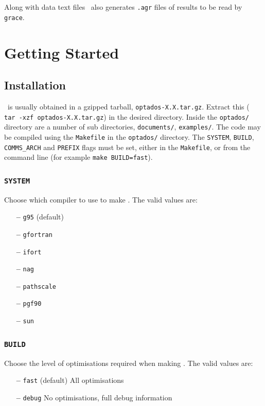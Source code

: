 \documentclass[a4paper,11pt,twoside]{book}
\begin{document}
Along with data text files \optados\ also generates \verb#.agr# files of results to be read by \verb#grace#. 


\chapter{Getting Started}\label{chap:getting_started}
\section{Installation}
\optados\ is usually obtained in a gzipped tarball, \verb#optados-X.X.tar.gz#. Extract this ( \verb# tar -xzf optados-X.X.tar.gz#) in the desired directory. Inside the  \verb#optados/# directory are a number of sub directories,  \verb#documents/#,   \verb#examples/#.  The code may be compiled using the \verb#Makefile# in the  \verb#optados/# directory.  The \verb#SYSTEM#, \verb#BUILD#, \verb#COMMS_ARCH# and \verb#PREFIX# flags must be set, either in the  \verb#Makefile#, or from the command line (for example  \verb#make BUILD=fast#).  

\subsection[system]{\tt SYSTEM}

Choose which compiler to use to make \optados. The valid values are:
\begin{itemize}
\item[{\bf --}]  \verb#g95# (default)
\item[{\bf --}]  \verb#gfortran#
\item[{\bf --}]  \verb#ifort#
\item[{\bf --}]  \verb#nag#
\item[{\bf --}]  \verb#pathscale#
\item[{\bf --}]  \verb#pgf90#
\item[{\bf --}]  \verb#sun#
\end{itemize}

\subsection[build]{\tt BUILD}

Choose the level of optimisations required when making \optados.  The valid values are:
\begin{itemize}
\item[{\bf --}]  \verb#fast# (default) All optimisations
\item[{\bf --}]  \verb#debug# No optimisations, full debug information
\end{itemize}
\end{document}
